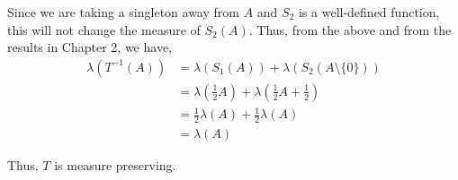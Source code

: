 \documentclass[12pt]{article}
\begin{document}
Since we are taking a singleton away from $A$ and $S_2$ is a well-defined function, this will not change the measure of $S_2(A)$. Thus, from the above and from the results in Chapter 2, we have,
\begin{align*}
\lambda(T^{-1}(A)) &= \lambda(S_1(A)) + \lambda(S_2(A \setminus \{0\}))\\
&= \lambda(\frac{1}{2}A) + \lambda(\frac{1}{2}A + \frac{1}{2})\\
&= \frac{1}{2}\lambda(A) + \frac{1}{2}\lambda(A)\\
&= \lambda(A)
\end{align*}

Thus, $T$ is measure preserving.
\end{document}
